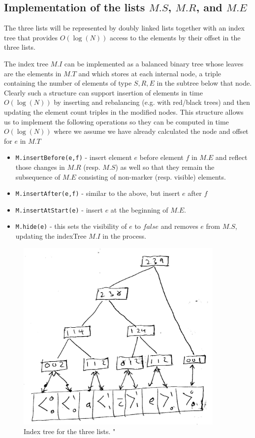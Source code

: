 \documentclass{amsart}
\begin{document}
\subsection{Implementation of the lists $M.S$, $M.R$, and $M.E$}
The three lists will be represented by doubly linked lists together with an index
tree that provides $O(\log(N))$ access to the elements by their offset in the three lists. 

The index tree $M.I$ can be implemented as a balanced binary tree whose leaves are the elements in $M.T$ and which stores at each internal node, a triple containing the number of elements of type $S,R,E$ in the subtree below that node. Clearly such a structure can support insertion of elements in time $O(\log(N))$ by inserting and rebalancing (e.g. with red/black trees) and then updating the element count triples in the modified nodes. This structure allows us to implement the following  operations so they can be computed in time $O(\log(N))$ where we assume we have already calculated the node and offset for $e$ in $M.T$
\begin{itemize}
\item {\tt M.insertBefore(e,f)} - insert element $e$ before element $f$ in $M.E$ and reflect those changes in $M.R$ (resp. $M.S$) as well so that they remain the subsequence of $M.E$ consisting of non-marker (resp. visible) elements.
\item {\tt M.insertAfter(e,f)} - similar to the above, but insert $e$ after $f$
\item {\tt M.insertAtStart(e)} - insert $e$ at the beginning of $M.E$.
\item {\tt M.hide(e)} - this sets the visibility of $e$ to $false$ and removes $e$ from $M.S$, updating the indexTree $M.I$ in the process.
\end{itemize}

\begin{figure}[h]
\centering
\includegraphics[width=4.0in]{MSETfig002.jpg}
\caption{Index tree for the three lists. \label{fig:indextree}"}
\end{figure}
\end{document}
